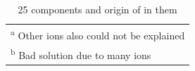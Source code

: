 \begin{table}[!h]
\begin{tabular}{cccc}
        \hline \hline  
        \multicolumn{4}{l}{\textsuperscript{a} \footnotesize{Other ions also could not be explained}} \\     
        \multicolumn{4}{l}{\textsuperscript{b} \footnotesize{Bad solution due to many ions}} \\ 

        \end{tabular}
    \caption{25  components and origin of  in them}
    \label{tab:OVI-origin}
\end{table}

